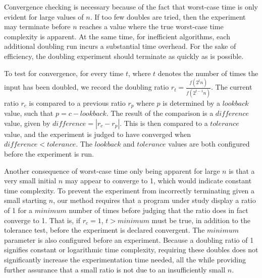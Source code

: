   Convergence checking is necessary because of the fact that worst-case time is only evident for large values of $n$.
  If too few doubles are tried, then the experiment may terminate before $n$ reaches a value where the true worst-case
  time complexity is apparent. At the same time, for inefficient  algorithms, each additional doubling run incurs a
  substantial time overhead. For the sake of efficiency, the doubling experiment should terminate as quickly as is possible.


  To test for convergence, for every time $t$, where $t$ denotes the number of times the input has been doubled, we
  record the doubling ratio $r_t = \frac{f(2^t n)}{f(2^{t-1}n)}$. The current ratio $r_c$ is compared to a previous
  ratio $r_p$ where $p$ is determined by a $\mathit{lookback}$ value, such that $p=c-\mathit{lookback}$.  The result of
  the comparison is a $\mathit{difference}$ value, given by $\mathit{difference} = |r_c - r_p|$.  This is then compared
  to a $\mathit{tolerance}$ value, and the experiment is judged to have converged when $\mathit{difference}<\mathit{tolerance}$.
  The $\mathit{lookback}$ and $\mathit{tolerance}$ values are both configured before the experiment is run.

  Another consequence of worst-case time only being apparent for large $n$ is that a very small initial $n$ may appear
  to converge to 1, which would indicate constant time complexity. To prevent the experiment from incorrectly terminating
  given a small starting $n$, our method requires that a program under study display a ratio of 1 for a
  $\mathit{minimum}$ number of times before judging that the ratio does in fact converge to 1.  That is, if $r_c = 1$,
  $t > \mathit{minimum}$ must be true, in addition to the tolerance test, before the experiment is declared convergent.
  The $\mathit{minimum}$ parameter is also configured before an experiment.  Because a doubling ratio of 1 signifies
  constant or logarithmic time complexity, requiring these doubles does not significantly increase the experimentation
  time needed, all the while providing further assurance that a small ratio is not due to an insufficiently small $n$.
